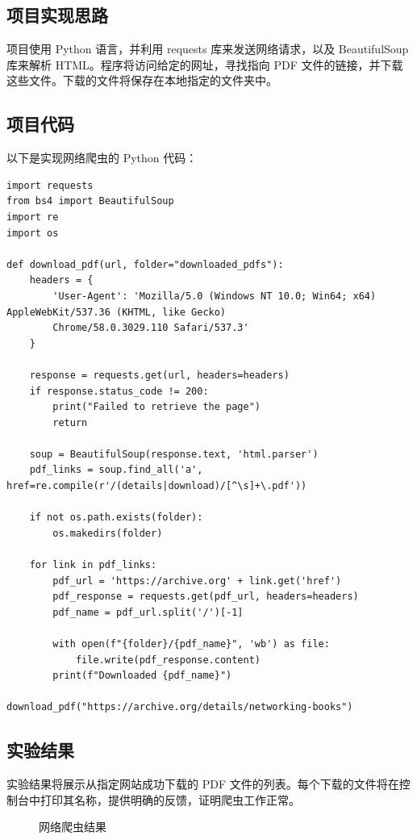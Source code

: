 \documentclass[UTF8,titlepage]{ctexart}
\numberwithin{figure}{section}
\begin{document}
\subsection{项目实现思路}
项目使用 Python 语言，并利用 requests 库来发送网络请求，以及 BeautifulSoup 库来解析 HTML。程序将访问给定的网址，寻找指向 PDF 文件的链接，并下载这些文件。下载的文件将保存在本地指定的文件夹中。

\subsection{项目代码}
以下是实现网络爬虫的 Python 代码：

\begin{verbatim}
import requests
from bs4 import BeautifulSoup
import re
import os

def download_pdf(url, folder="downloaded_pdfs"):
    headers = {
        'User-Agent': 'Mozilla/5.0 (Windows NT 10.0; Win64; x64) AppleWebKit/537.36 (KHTML, like Gecko) 
        Chrome/58.0.3029.110 Safari/537.3'
    }

    response = requests.get(url, headers=headers)
    if response.status_code != 200:
        print("Failed to retrieve the page")
        return

    soup = BeautifulSoup(response.text, 'html.parser')
    pdf_links = soup.find_all('a', href=re.compile(r'/(details|download)/[^\s]+\.pdf'))

    if not os.path.exists(folder):
        os.makedirs(folder)

    for link in pdf_links:
        pdf_url = 'https://archive.org' + link.get('href')
        pdf_response = requests.get(pdf_url, headers=headers)
        pdf_name = pdf_url.split('/')[-1]

        with open(f"{folder}/{pdf_name}", 'wb') as file:
            file.write(pdf_response.content)
        print(f"Downloaded {pdf_name}")

download_pdf("https://archive.org/details/networking-books")
\end{verbatim}

\subsection{实验结果}
实验结果将展示从指定网站成功下载的 PDF 文件的列表。每个下载的文件将在控制台中打印其名称，提供明确的反馈，证明爬虫工作正常。
\begin{figure}[H]
\centering
 \caption{网络爬虫结果}
 \label{}
\end{figure}
\end{document}

